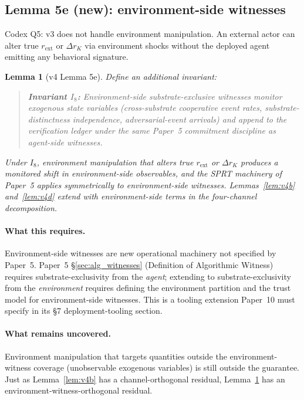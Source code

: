 \documentclass{article}
\newtheorem{lemma}{Lemma}
\newcommand{\rext}{r_{\mathrm{ext}}}
\begin{document}
\subsection{Lemma 5e (new): environment-side witnesses}

Codex Q5: v3 does not handle environment manipulation.  An external
actor can alter true $\rext$ or $\Delta r_K$ via environment shocks
without the deployed agent emitting any behavioral signature.

\begin{lemma}[v4 Lemma 5e]
\label{lem:v4e}
Define an additional invariant:

\begin{quote}
\textbf{Invariant $I_8$:} Environment-side substrate-exclusive
witnesses monitor exogenous state variables (cross-substrate
cooperative event rates, substrate-distinctness independence,
adversarial-event arrivals) and append to the verification ledger
under the same Paper~5 commitment discipline as agent-side witnesses.
\end{quote}

Under $I_8$, environment manipulation that alters true $\rext$ or
$\Delta r_K$ produces a monitored shift in environment-side
observables, and the SPRT machinery of Paper~5 applies symmetrically
to environment-side witnesses.  Lemmas~\ref{lem:v4b} and~\ref{lem:v4d}
extend with environment-side terms in the four-channel decomposition.
\end{lemma}

\paragraph{What this requires.}
Environment-side witnesses are new operational machinery not specified
by Paper~5.  Paper~5 \S\ref{sec:alg_witnesses} (Definition of
Algorithmic Witness) requires substrate-exclusivity from the
\emph{agent}; extending to substrate-exclusivity from the
\emph{environment} requires defining the environment partition and
the trust model for environment-side witnesses.  This is a tooling
extension Paper~10 must specify in its §7 deployment-tooling section.

\paragraph{What remains uncovered.}
Environment manipulation that targets quantities outside the
environment-witness coverage (unobservable exogenous variables) is
still outside the guarantee.  Just as Lemma~\ref{lem:v4b} has a
channel-orthogonal residual, Lemma~\ref{lem:v4e} has an
environment-witness-orthogonal residual.
\end{document}
